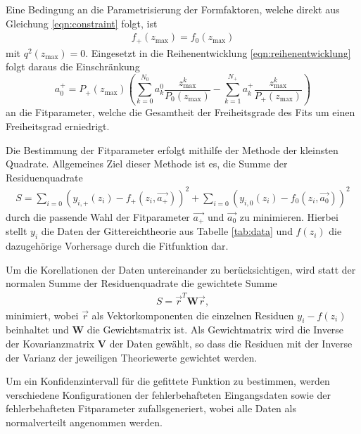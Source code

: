 Eine Bedingung an die Parametrisierung der Formfaktoren, welche direkt aus Gleichung \eqref{eqn:constraint} folgt, ist
\begin{align*}
  f_+(z_\text{max}) = f_0(z_\text{max})
\end{align*}
mit $q^2(z_\text{max}) = 0$.
Eingesetzt in die Reihenentwicklung \eqref{eqn:reihenentwicklung} folgt daraus die Einschränkung
\begin{equation}
  \label{eqn:einschr}
  a_0^+ = P_+(z_\text{max}) \left( \sum_{k=0}^{N_0} a_k^0 \frac{z_{\text{max}}^k}{P_0(z_\text{max})} - \sum_{k=1}^{N_+} a_k^+ \frac{z_{\text{max}}^k}{P_+(z_\text{max})} \right)
\end{equation}
an die Fitparameter, welche die Gesamtheit der Freiheitsgrade des Fits um einen Freiheitsgrad erniedrigt.

Die Bestimmung der Fitparameter erfolgt mithilfe der Methode der kleinsten Quadrate.
Allgemeines Ziel dieser Methode ist es, die Summe der Residuenquadrate
\begin{align*}
  S = \sum_{i=0}^{} \left( y_{i,+}(z_i) - f_{+}(z_i, \vec{a_+}) \right)^2 + \sum_{i=0}^{} \left( y_{i,0}(z_i) - f_{0}(z_i, \vec{a_0}) \right)^2
\end{align*}
durch die passende Wahl der Fitparameter $\vec{a_+}$ und $\vec{a_0}$ zu minimieren.
Hierbei stellt $y_i$ die Daten der Gittereichtheorie aus Tabelle \ref{tab:data} und $f(z_i)$ die dazugehörige Vorhersage durch die Fitfunktion dar.

Um die Korellationen der Daten untereinander zu berücksichtigen, wird statt der normalen Summe der Residuenquadrate die gewichtete Summe
\begin{align*}
  S = \vec{r}^T \symbf{W} \vec{r},
\end{align*}
minimiert, wobei $\vec{r}$ als Vektorkomponenten die einzelnen Residuen $y_i - f(z_i)$ beinhaltet und $\symbf{W}$ die Gewichtsmatrix ist.
Als Gewichtmatrix wird die Inverse der Kovarianzmatrix $\symbf{V}$ der Daten gewählt, so dass die Residuen mit der Inverse der Varianz der jeweiligen Theoriewerte gewichtet werden. 

Um ein Konfidenzintervall für die gefittete Funktion zu bestimmen, werden $$ verschiedene Konfigurationen der fehlerbehafteten Eingangsdaten sowie der fehlerbehafteten Fitparameter zufallsgeneriert, wobei alle Daten als normalverteilt angenommen werden. 

